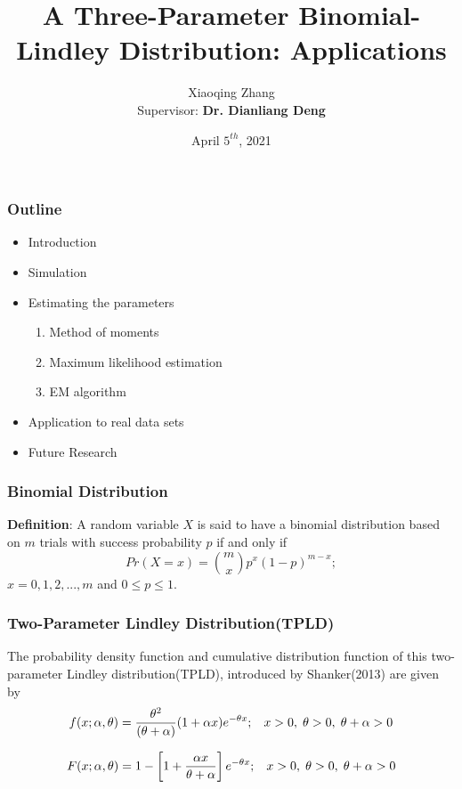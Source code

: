 \documentclass{beamer}
\title[]{A Three-Parameter Binomial-Lindley Distribution: Applications}
\author[University of Regina]{Xiaoqing Zhang\\
   \vspace{4mm}
    {Supervisor: \textbf{Dr. Dianliang Deng}}}
\date { April $5^{th}$, 2021}
\begin{document}
\begin{frame}
	\titlepage %
\end{frame}
\begin{frame}
\frametitle{Outline}
\begin{itemize}
    \item Introduction
    \item Simulation
	\item Estimating the parameters
	\vspace{2mm}
	\begin{enumerate}
        \item  Method of moments
        \vspace{2mm}
        \item Maximum likelihood estimation
        \vspace{2mm}
        \item  EM algorithm
        \vspace{2mm}
        \end{enumerate}
	\vspace{2mm}
	\item Application to real data sets
	\vspace{2mm}
    \item Future Research
	\end{itemize}
\end{frame}

\begin{frame}
\frametitle{Binomial Distribution}
\textbf{Definition}: A random variable $X$ is said to have a binomial distribution based on $m$ trials with success probability $p$ if and only if
\vspace{2mm}
\[
Pr(X=x)={m \choose x} p^x (1-p)^{m-x};
\]
\hspace{60mm} $x=0,1,2,..., m$ and $ 0\leq p \leq 1$.
\end{frame}


\begin{frame}
\frametitle{Two-Parameter Lindley Distribution(TPLD)}
\hspace{5mm}The probability density function and cumulative distribution function of this two-parameter Lindley distribution(TPLD), introduced by Shanker(2013) are
given by
\[
f(x;\alpha,\theta)= \frac{\theta^2}{(\theta+\alpha)} (1+\alpha x) e^{-\theta x} ; \hspace{3mm}   	x>0,\hspace{1mm} \theta>0 ,\hspace{1mm} \theta+ \alpha>0
\]

\[
F(x;\alpha,\theta)=1-\left[ 1+ \frac{\alpha x}{\theta+\alpha}\right] e^{-\theta x};\hspace{3mm} x>0,\hspace{1mm} \theta>0 , \hspace{1mm}\theta+ \alpha>0
\]
\end{frame}
\end{document}
